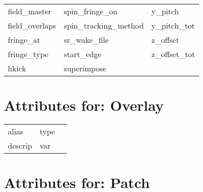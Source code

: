 \begin{tabular}{lll}
field_master                & spin_fringe_on              & y_pitch                     \\
field_overlaps              & spin_tracking_method        & y_pitch_tot                 \\
fringe_at                   & sr_wake_file                & z_offset                    \\
fringe_type                 & start_edge                  & z_offset_tot                \\
hkick                       & superimpose                 &                             \\
 \bottomrule
 \end{tabular}
 \vfill
 
 \section{Attributes for: Overlay}
 \label{s:list.overlay}
 
 \begin{tabular}{lll} \toprule
alias                       & type                        &                             \\
descrip                     & var                         &                             \\
 \bottomrule
 \end{tabular}
 \vfill
 
 \section{Attributes for: Patch}
 \label{s:list.patch}
 
